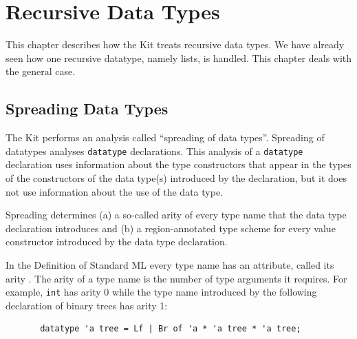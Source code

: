 \documentclass[12pt]{book}
\begin{document}
\chapter{Recursive Data Types}
\label{datatypes.sec}
This chapter describes how the Kit treats  recursive data types. We have already
seen how one recursive datatype, namely lists, is handled. This chapter deals
with the general case.
\section{Spreading Data Types}
The Kit performs an analysis  called ``spreading of data types''.
Spreading of datatypes analyses {\tt datatype} declarations. 
This analysis of a {\tt datatype} declaration uses information
about the type constructors that appear in the types of the constructors
of the data type(s) introduced by the declaration, but it does not
use information about the use of the data type.

Spreading
determines  (a) a so-called arity of every type name
that the data type declaration introduces and (b) a region-annotated type scheme for
every value constructor introduced by the data type declaration. 

In the Definition of Standard ML every type name has an attribute, 
called its arity \cite{mthm97}. The arity of a type name is the number of
type arguments it requires. For example, {\tt int} has
arity 0 while the type name introduced by the following 
declaration of binary trees has arity 1:
\begin{verbatim}
       datatype 'a tree = Lf | Br of 'a * 'a tree * 'a tree;
\end{verbatim}
\end{document}
